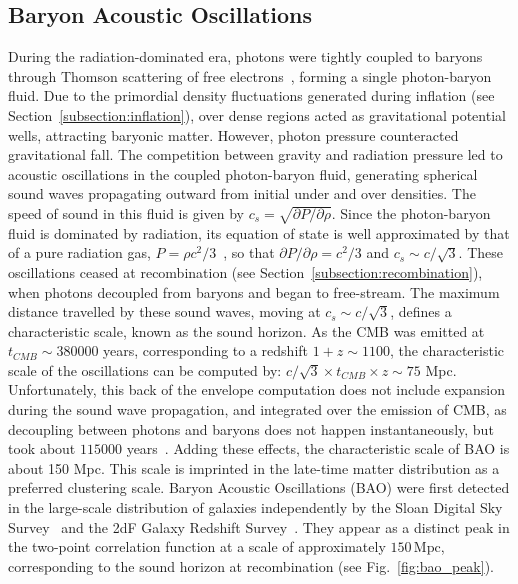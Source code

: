 \documentclass[../../thesis.tex]{subfiles}
\begin{document}
\subsection{Baryon Acoustic Oscillations} \label{subsection:bao}

During the radiation-dominated era, photons were tightly coupled to baryons through Thomson scattering of free electrons~\cite{dodelson}, forming a single photon-baryon fluid. Due to the primordial density fluctuations generated during inflation (see Section~\ref{subsection:inflation}), over dense regions acted as gravitational potential wells, attracting baryonic matter.
However, photon pressure counteracted gravitational fall. The competition between gravity and radiation pressure led to acoustic oscillations in the coupled photon-baryon fluid, generating spherical sound waves propagating outward from initial under and over densities. The speed of sound in this fluid is given by $c_s = \sqrt{\partial P / \partial \rho}$. Since the photon-baryon fluid is dominated by radiation, its equation of state is well approximated by that of a pure radiation gas, $P = \rho c^2 / 3$~\cite{dodelson}, so that $\partial P / \partial \rho = c^2/3$ and $c_s \sim c / \sqrt{3}$.
These oscillations ceased at recombination (see Section~\ref{subsection:recombination}), when photons decoupled from baryons and began to free-stream. The maximum distance travelled by these sound waves, moving at $c_s \sim c / \sqrt{3}$, defines a characteristic scale, known as the sound horizon. As the CMB was emitted at $t_{CMB} \sim 380000$ years, corresponding to a redshift $1 + z \sim 1100$, the characteristic scale of the oscillations can be computed by: $c / \sqrt{3} \times t_{CMB} \times z \sim 75$ Mpc. Unfortunately, this back of the envelope computation does not include expansion during the sound wave propagation, and integrated over the emission of CMB, as decoupling between photons and baryons does not happen instantaneously, but took about $115000$ years~\cite{planck2018VI}. Adding these effects, the characteristic scale of BAO is about 150 Mpc.
This scale is imprinted in the late-time matter distribution as a preferred clustering scale. Baryon Acoustic Oscillations (BAO) were first detected in the large-scale distribution of galaxies independently by the Sloan Digital Sky Survey~\cite{Eisenstein_2005} and the 2dF Galaxy Redshift Survey~\cite{Cole_2005}. They appear as a distinct peak in the two-point correlation function at a scale of approximately $150\,\mathrm{Mpc}$, corresponding to the sound horizon at recombination (see Fig.~\ref{fig:bao_peak}).
\end{document}
